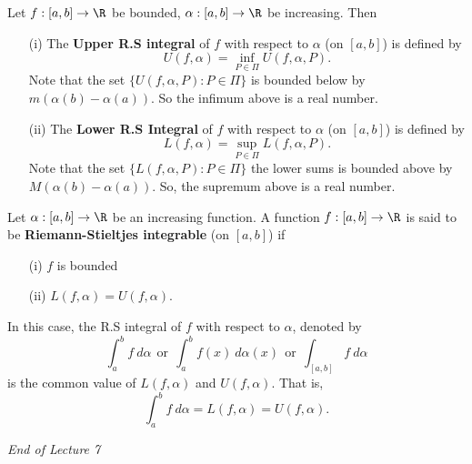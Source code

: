 \begin{definition}
    Let \( f: [a,b] \to \R  \) be bounded, \( \alpha: [a,b] \to \R  \) be increasing. Then 
    \begin{enumerate}
        \item[(i)] The \textbf{Upper R.S integral} of \( f  \) with respect to \( \alpha \) (on \( [a,b] \)) is defined by 
            \[  U(f,\alpha) = \inf_{P \in \Pi} U(f,\alpha, P).   \]
            Note that the set \( \{  U(f,\alpha, P) : P \in \Pi \}   \) is bounded below by \( m (\alpha(b) - \alpha(a)) \). So the infimum above is a real number. 
        \item[(ii)] The \textbf{Lower R.S Integral} of \( f  \) with respect to \( \alpha \) (on \( [a,b] \)) is defined by
            \[  L(f,\alpha) = \sup_{P \in \Pi} L(f,\alpha, P ). \]
            Note that the set \( \{  L(f,\alpha, P ) : P \in \Pi \} \)
            the lower sums is bounded above by \( M(\alpha(b) - \alpha(a)) \). So, the supremum above is a real number.
    \end{enumerate}
\end{definition}

\begin{definition}\label{The definition of Riemann-Stieltjes integral}
    Let \( \alpha : [a,b] \to \R  \) be an increasing function. A function \( f: [a,b] \to \R  \) is said to be \textbf{Riemann-Stieltjes integrable} (on \( [a,b] \)) if 
    \begin{enumerate}
        \item[(i)] \( f \) is bounded
        \item[(ii)] \( L(f,\alpha) = U(f,\alpha) \).
    \end{enumerate}
    In this case, the R.S integral of \( f  \) with respect to \( \alpha \), denoted by
    \[ \int_{ a }^{ b }  f  \ d \alpha \ \ \text{or} \ \ \int_{ a }^{ b }  f(x)  \ d \alpha(x) \ \ \text{or} \ \ \int_{ [a,b] } f   \ d \alpha  \]
    is the common value of \( L(f,\alpha) \) and \( U(f,\alpha) \). That is, 
    \[  \int_{ a }^{ b }  f  \ d \alpha = L (f,\alpha) = U(f,\alpha). \]
\end{definition}


\begin{center}
    \textit{End of Lecture 7} 
\end{center}




